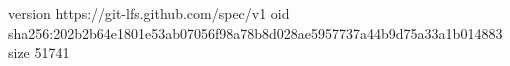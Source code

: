 version https://git-lfs.github.com/spec/v1
oid sha256:202b2b64e1801e53ab07056f98a78b8d028ae5957737a44b9d75a33a1b014883
size 51741
